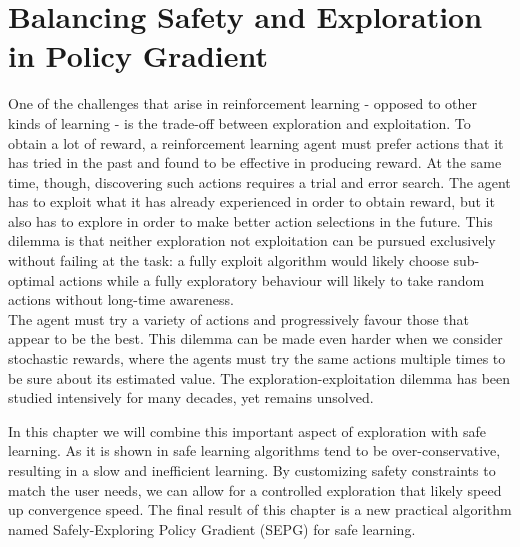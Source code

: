 \chapter{Balancing Safety and Exploration in Policy Gradient}
\label{ch:balance}
\thispagestyle{empty}

\fancyhead[LE,RO]{\bfseries\thepage}                               
\fancyhead[LO]{\bfseries\rightmark}  


One of the challenges that arise in reinforcement learning - opposed to other kinds of learning - is the trade-off between exploration and exploitation. To obtain a lot of reward, a reinforcement learning agent must prefer actions that it has tried in the past and found to be effective in producing reward. At the same time, though, discovering such actions requires a trial and error search. The agent has to exploit what it has already experienced in order to obtain reward, but it also has to explore in order to make better action selections in the future. This dilemma is that neither exploration not exploitation can be pursued exclusively without failing at the task: a fully exploit algorithm would likely choose sub-optimal actions while a fully exploratory behaviour will likely to take random actions without long-time awareness.\\
The agent must try a variety of actions and progressively favour those that appear to be the best. This dilemma can be made even harder when we consider stochastic rewards, where the agents must try the same actions multiple times to be sure about its estimated value. The exploration-exploitation dilemma has been studied intensively for many decades, yet remains unsolved. 

In this chapter we will combine this important aspect of exploration with safe learning. As it is shown in  safe learning algorithms tend to be over-conservative, resulting in a slow and inefficient learning. By customizing safety constraints to match the user needs, we can allow for a controlled exploration that likely speed up convergence speed. The final result of this chapter is a new practical algorithm named Safely-Exploring Policy Gradient (SEPG) for safe learning. 

